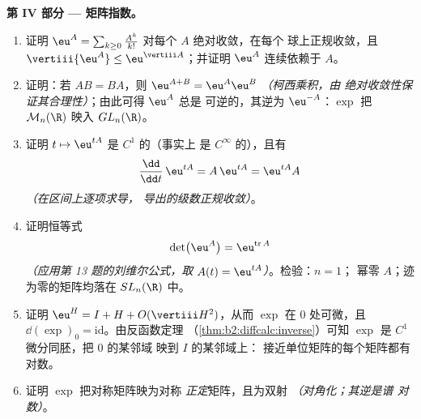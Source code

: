 \begin{problem}
\medskip
\noindent\textbf{第 IV 部分 --- 矩阵指数。}
\begin{enumerate}[resume]
  \item 证明 $\eu^A = \sum_{k\geq0}\frac{A^k}{k!}$
        对每个 $A$ 绝对收敛，在每个
        球上正规收敛，且 $\vertiii{\eu^A} \leq
        \eu^{\vertiii A}$；并证明 $\eu^A$
        连续依赖于 $A$。
  \item 证明：若 $AB = BA$，则 $\eu^{A+B} =
        \eu^A\eu^B$ \emph{（柯西乘积，由
        绝对收敛性保证其合理性）}；由此可得 $\eu^A$ 总是
        可逆的，其逆为 $\eu^{-A}$：$\exp$ 把
        $\mathcal M_n(\R)$ 映入 $GL_n(\R)$。
  \item 证明 $t \mapsto \eu^{tA}$ 是 $C^1$ 的（事实上
        是 $C^\infty$ 的），且有
        \[
        \frac{\dd}{\dd t}\,\eu^{tA} = A\,\eu^{tA} =
        \eu^{tA}A
        \]
        \emph{（在区间上逐项求导，
        导出的级数正规收敛）}。
  \item 证明恒等式
        \[
        \det\bigl(\eu^{A}\bigr) = \eu^{\operatorname{tr}A}
        \]
        \emph{（应用第 13 题的刘维尔公式，取
        $A(t) = \eu^{tA}$）}。检验：$n = 1$；
        幂零 $A$；迹为零的矩阵均落在
        $SL_n(\R)$ 中。
  \item 证明 $\eu^H = I + H + O(\vertiii H^2)$，从而 $\exp$ 在
        $0$ 处可微，且 $\dd(\exp)_0 =
        \mathrm{id}$。由反函数定理
        （\cref{thm:b2:diffcalc:inverse}）可知 $\exp$
        是 $C^1$ 微分同胚，把 $0$ 的某邻域
        映到 $I$ 的某邻域上：
        接近单位矩阵的每个矩阵都有对数。
  \item 证明 $\exp$ 把对称矩阵映为对称
        \emph{正定}矩阵，且为双射
        \emph{（对角化；其逆是谱
        对数）}。
\end{enumerate}


\end{problem}
